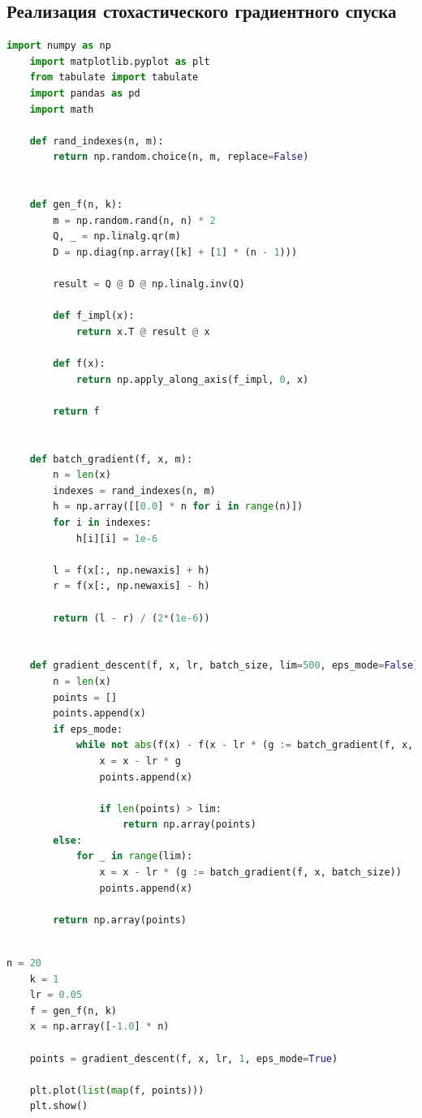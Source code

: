 \documentclass[a4paper,14pt,oneside,openany]{memoir}
\begin{document}
\subsection{Реализация стохастического градиентного спуска}
\begin{lstlisting}[language=Python, caption=Стохастический градиентный спуск]
	import numpy as np
	import matplotlib.pyplot as plt
	from tabulate import tabulate
	import pandas as pd
	import math
	
	def rand_indexes(n, m):
	    return np.random.choice(n, m, replace=False)
	
	
	def gen_f(n, k):
	    m = np.random.rand(n, n) * 2
	    Q, _ = np.linalg.qr(m)
	    D = np.diag(np.array([k] + [1] * (n - 1)))
	
	    result = Q @ D @ np.linalg.inv(Q)
	
	    def f_impl(x):
	        return x.T @ result @ x
	
	    def f(x):
	        return np.apply_along_axis(f_impl, 0, x)
	
	    return f
	
	
	def batch_gradient(f, x, m):
	    n = len(x)
	    indexes = rand_indexes(n, m)
	    h = np.array([[0.0] * n for i in range(n)])
	    for i in indexes:
	        h[i][i] = 1e-6
	
	    l = f(x[:, np.newaxis] + h)
	    r = f(x[:, np.newaxis] - h)
	
	    return (l - r) / (2*(1e-6))
	
	
	def gradient_descent(f, x, lr, batch_size, lim=500, eps_mode=False):
	    n = len(x)
	    points = []
	    points.append(x)
	    if eps_mode:
	        while not abs(f(x) - f(x - lr * (g := batch_gradient(f, x, batch_size)))) < eps:
	            x = x - lr * g
	            points.append(x)
	
	            if len(points) > lim:
	                return np.array(points)
	    else:
	        for _ in range(lim):
	            x = x - lr * (g := batch_gradient(f, x, batch_size))
	            points.append(x)
	
	    return np.array(points)
	
\end{lstlisting}

\begin{lstlisting}[language=Python, caption=Пример использования стохастического градиентного спуска]
	n = 20
	k = 1
	lr = 0.05
	f = gen_f(n, k)
	x = np.array([-1.0] * n)
	
	points = gradient_descent(f, x, lr, 1, eps_mode=True)
	
	plt.plot(list(map(f, points)))
	plt.show()
\end{lstlisting}
\end{document}

